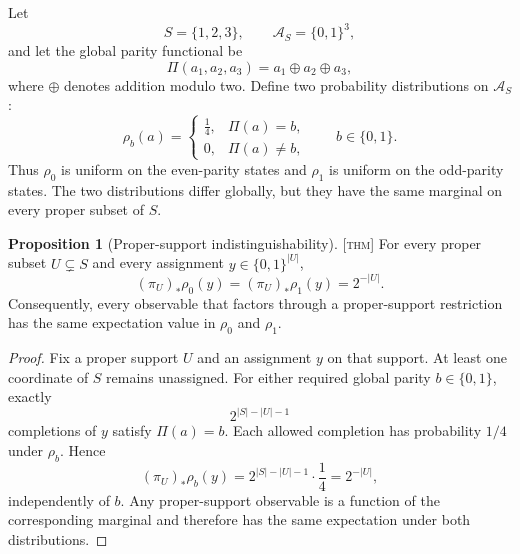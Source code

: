 \documentclass[11pt]{article}
\newcommand{\Thm}{\textsc{[thm]}}
\theoremstyle{definition}
\newtheorem{sproposition}{Proposition}
\begin{document}
Let
\begin{equation}
S=\{1,2,3\},
\qquad
\mathcal A_S=\{0,1\}^{3},
\label{eq:parity-support}
\end{equation}
and let the global parity functional be
\begin{equation}
\Pi(a_1,a_2,a_3)=a_1\oplus a_2\oplus a_3,
\label{eq:global-parity}
\end{equation}
where $\oplus$ denotes addition modulo two. Define two probability
distributions on $\mathcal A_S$:
\begin{equation}
\rho_b(a)=
\begin{cases}
\frac{1}{4}, & \Pi(a)=b,\\[4pt]
0, & \Pi(a)\neq b,
\end{cases}
\qquad b\in\{0,1\}.
\label{eq:parity-distributions}
\end{equation}
Thus $\rho_0$ is uniform on the even-parity states and $\rho_1$ is uniform on
the odd-parity states. The two distributions differ globally, but they have the
same marginal on every proper subset of $S$.

\begin{sproposition}[Proper-support indistinguishability]
\label{prop:proper-support-indistinguishability}
\Thm{} For every proper subset $U\subsetneq S$ and every assignment
$y\in\{0,1\}^{|U|}$,
\begin{equation}
(\pi_U)_*\rho_0(y)
=
(\pi_U)_*\rho_1(y)
=
2^{-|U|}.
\label{eq:proper-support-marginal}
\end{equation}
Consequently, every observable that factors through a proper-support restriction
has the same expectation value in $\rho_0$ and $\rho_1$.
\end{sproposition}

\begin{proof}
Fix a proper support $U$ and an assignment $y$ on that support. At least one
coordinate of $S$ remains unassigned. For either required global parity
$b\in\{0,1\}$, exactly
\begin{equation}
2^{|S|-|U|-1}
\end{equation}
completions of $y$ satisfy $\Pi(a)=b$. Each allowed completion has probability
$1/4$ under $\rho_b$. Hence
\begin{equation}
(\pi_U)_*\rho_b(y)
=
2^{|S|-|U|-1}\cdot\frac{1}{4}
=
2^{-|U|},
\end{equation}
independently of $b$. Any proper-support observable is a function of the
corresponding marginal and therefore has the same expectation under both
distributions.
\end{proof}
\end{document}
